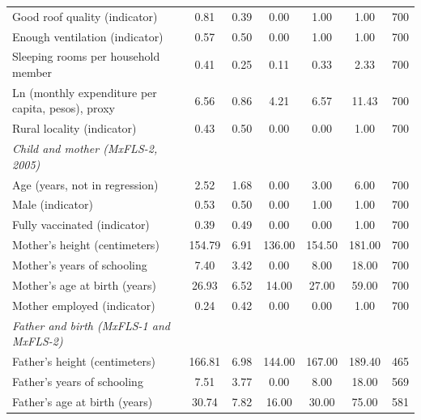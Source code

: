 \documentclass[12pt]{article}
\begin{document}
\begin{table}[H]
{\begin{tabular}{l*{6}{c}}
Good roof quality (indicator)&        0.81&        0.39&        0.00&        1.00&        1.00&         700\\
Enough ventilation (indicator)&        0.57&        0.50&        0.00&        1.00&        1.00&         700\\
Sleeping rooms per household member&        0.41&        0.25&        0.11&        0.33&        2.33&         700\\
Ln (monthly expenditure per capita, pesos), proxy&        6.56&        0.86&        4.21&        6.57&       11.43&         700\\
Rural locality (indicator)&        0.43&        0.50&        0.00&        0.00&        1.00&         700\\
\addlinespace[6pt]\textit{Child and mother (MxFLS-2, 2005)}&            &            &            &            &            &            \\
Age (years, not in regression)&        2.52&        1.68&        0.00&        3.00&        6.00&         700\\
Male (indicator)    &        0.53&        0.50&        0.00&        1.00&        1.00&         700\\
Fully vaccinated (indicator)&        0.39&        0.49&        0.00&        0.00&        1.00&         700\\
Mother's height (centimeters)&      154.79&        6.91&      136.00&      154.50&      181.00&         700\\
Mother's years of schooling&        7.40&        3.42&        0.00&        8.00&       18.00&         700\\
Mother's age at birth (years)&       26.93&        6.52&       14.00&       27.00&       59.00&         700\\
Mother employed (indicator)&        0.24&        0.42&        0.00&        0.00&        1.00&         700\\
\addlinespace[6pt]\textit{Father and birth (MxFLS-1 and MxFLS-2)}&            &            &            &            &            &            \\
Father's height (centimeters)&      166.81&        6.98&      144.00&      167.00&      189.40&         465\\
Father's years of schooling&        7.51&        3.77&        0.00&        8.00&       18.00&         569\\
Father's age at birth (years)&       30.74&        7.82&       16.00&       30.00&       75.00&         581\\

\end{tabular}}
\end{table}
\end{document}
